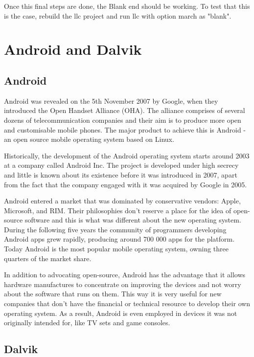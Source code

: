 \documentclass[parskip]{cs4rep}
\begin{document}
Once this final steps are done, the Blank end should be working. To test that this is the case, rebuild the llc project and run llc with option march as "blank".

\section{Android and Dalvik}

\subsection{Android}

Android was revealed on the 5th November 2007 by Google, when they introduced the Open Handset Alliance (OHA)\cite{DeLacey2007}. The alliance comprises of several dozens of telecommunication companies and their aim is to produce more open and customisable mobile phones. The major product to achieve this is Android - an open source mobile operating system based on Linux.

Historically, the development of the Android operating system starts around 2003 at a company called Android Inc\cite{BloombergBusinessweek2005}. The project is developed under high secrecy and little is known about its existence before it was introduced in 2007, apart from the fact that the company engaged with it was acquired by Google in 2005.

Android entered a market that was dominated by conservative vendors: Apple, Microsoft, and RIM. Their philosophies don't reserve a place for the idea of open-source software and this is what was different about the new operating system. During the following five years the community of programmers developing Android apps grew rapidly, producing around 700 000 apps for the platform\cite{Islam2012}. Today Android is the most popular mobile operating system, owning three quarters of the market share\cite{IDC2012}.

In addition to advocating open-source, Android has the advantage that it allows hardware manufactures to concentrate on improving the devices and not worry about the software that runs on them. This way it is very useful for new companies that don't have the financial or technical resource to develop their own operating system. As a result, Android is even employed in devices it was not originally intended for, like TV sets and game consoles\cite{Telecompaper2012}\cite{Etherington2013}.

\subsection{Dalvik}
\end{document}
